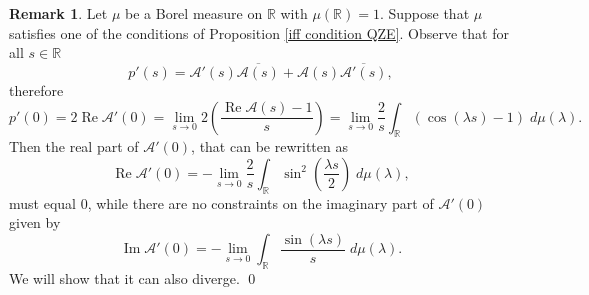 \documentclass[aip,jmp
]{revtex4}
\renewcommand{\Re}{\mathop{\mathrm{Re}}\nolimits}
\renewcommand{\Im}{\mathop{\mathrm{Im}}\nolimits}
\newcommand{\RM}{\mathbb{R}}
\theoremstyle{definition}
\newtheorem{remark}{Remark}
\begin{document}
\begin{remark}
Let $\mu$ be a Borel measure on $\RM$ with $\mu(\RM)=1$. 
Suppose that $\mu$ satisfies one of the conditions of Proposition \ref{iff condition QZE}. 
Observe that for all $s \in \RM$
$$
p'(s)=\mathcal{A}'(s)\overline{\mathcal{A}(s)}+\mathcal{A}(s)\overline{\mathcal{A}'(s)},
$$
therefore
$$
p'(0)=2\Re \mathcal{A}'(0)=\lim_{s \to 0} 2 \left(\frac{\Re \mathcal{A}(s)-1}{s}\right)=\lim_{s \to 0} \frac{2}{s} \int_{\RM} (\cos ( \lambda s) -1)\; d\mu(\lambda).
$$
Then the real part of $\mathcal{A}'(0)$, that can be rewritten as
\[
\Re \mathcal{A}'(0)=- \lim_{s \to 0} \frac{2}{s} \int_{\RM} \sin^2\left(\frac{\lambda s}{2}\right)\; d\mu(\lambda),
\]
must equal $0$, while there are no constraints on the imaginary part of $\mathcal{A}'(0)$ given by
\[
\Im \mathcal{A}'(0)=- \lim_{s \to 0} \int_{\RM} \frac{\sin(\lambda s)}{s}\; d\mu(\lambda).
\]
We will show that it can also diverge. \qed
\end{remark}
\end{document}
